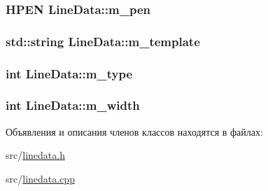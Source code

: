 \hypertarget{class_line_data_a2774a276fe32645f8d0b44a3032fbf48}{
\subsubsection[{m\-\_\-pen}]{\setlength{\rightskip}{0pt plus 5cm}H\-P\-E\-N Line\-Data\-::m\-\_\-pen\hspace{0.3cm}{\ttfamily [protected]}}}\label{class_line_data_a2774a276fe32645f8d0b44a3032fbf48}
\hypertarget{class_line_data_ab1383399938d3d85c3f3b1caa488f322}{
\subsubsection[{m\-\_\-template}]{\setlength{\rightskip}{0pt plus 5cm}std\-::string Line\-Data\-::m\-\_\-template\hspace{0.3cm}{\ttfamily [protected]}}}\label{class_line_data_ab1383399938d3d85c3f3b1caa488f322}
\hypertarget{class_line_data_a67b36139f7b94ec45cbb434cf597ec09}{
\subsubsection[{m\-\_\-type}]{\setlength{\rightskip}{0pt plus 5cm}int Line\-Data\-::m\-\_\-type\hspace{0.3cm}{\ttfamily [protected]}}}\label{class_line_data_a67b36139f7b94ec45cbb434cf597ec09}
\hypertarget{class_line_data_a2f510fa43948464d6764fc3e117b5006}{
\subsubsection[{m\-\_\-width}]{\setlength{\rightskip}{0pt plus 5cm}int Line\-Data\-::m\-\_\-width\hspace{0.3cm}{\ttfamily [protected]}}}\label{class_line_data_a2f510fa43948464d6764fc3e117b5006}


Объявления и описания членов классов находятся в файлах\-:\begin{DoxyCompactItemize}
\item 
src/\hyperlink{linedata_8h}{linedata.\-h}\item 
src/\hyperlink{linedata_8cpp}{linedata.\-cpp}\end{DoxyCompactItemize}
